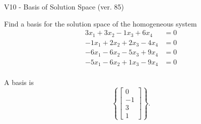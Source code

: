 \begin{exercise}
  \begin{exerciseTitle}V10 - Basis of Solution Space (ver. 85)\end{exerciseTitle}
  \begin{exerciseStatement}
    Find a basis for the solution space of the homogeneous system 
\begin{align*}
 3 x_ 1 + 3 x_ 2 -1 x_ 3 + 6 x_ 4 &= 0  \\ 
  -1 x_ 1 + 2 x_ 2 + 2 x_ 3 -4 x_ 4 &= 0  \\ 
  -6 x_ 1 -6 x_ 2 -5 x_ 3 + 9 x_ 4 &= 0  \\ 
  -5 x_ 1 -6 x_ 2 + 1 x_ 3 -9 x_ 4 &= 0  \\ 
 \end{align*}


 
  \end{exerciseStatement}

  \begin{exerciseAnswer}
   A basis is   
\[\left\{\left[\begin{array}{c}
0 \\
-1 \\
3 \\
1
\end{array}\right]\right\}.\]

  


  \end{exerciseAnswer}
\end{exercise}